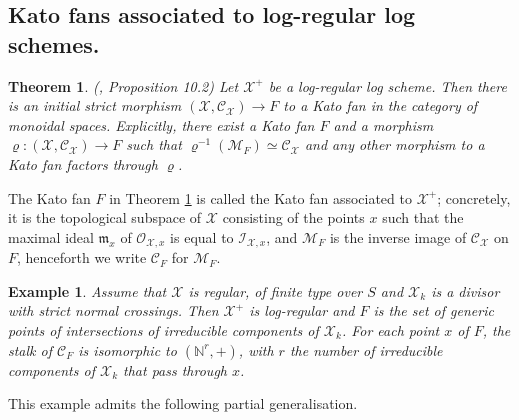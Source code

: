\documentclass{amsart}%
\numberwithin{equation}{subsection}
\theoremstyle{plain2}
\newtheorem{thm}[equation]{Theorem}
\theoremstyle{definition2}
\newtheorem{example}[equation]{Example}
\theoremstyle{stepstyle}
\theoremstyle{point}
\theoremstyle{subpoint}
\newcommand{\N}{\ensuremath{\mathbb{N}}}
\newcommand{\cX}{\ensuremath{\mathscr{X}}}
\newcommand{\caM}{\ensuremath{\mathcal{M}}}
\newcommand{\caC}{\ensuremath{\mathcal{C}}}
\begin{document}
\subsection{Kato fans associated to log-regular log schemes.}
\begin{thm}\label{kato fan associated} (\cite{Kato1994a}, Proposition 10.2)
Let $\cX^+$ be a log-regular log scheme. Then there is an initial strict morphism $(\cX, \caC_{\cX}) \rightarrow F$ to a Kato fan in the category of monoidal spaces. Explicitly, there exist a Kato fan $F$ and a morphism $\varrho: (\cX, \caC_{\cX}) \rightarrow F$ such that $\varrho^{-1}(\caM_{F}) \simeq \caC_{\cX}$ and any other morphism to a Kato fan factors through $\varrho$.
\end{thm}
The Kato fan $F$ in Theorem \ref{kato fan associated} is called the Kato fan associated to $\cX^+$; concretely, it is the topological subspace of
$\cX$ consisting of the points $x$ such that the maximal ideal $\mathfrak{m}_x$ of
$\mathcal{O}_{\cX,x}$ is equal to $\mathcal{I}_{\cX,x}$, and
$\mathcal{M}_F$ is the inverse image of $\mathcal{C}_{\cX}$ on
$F$, henceforth we write $\caC_F$ for $\caM_F$.

\begin{example} \label{example kato fan regular model}
Assume that $\cX$ is regular, of finite type over $S$ and $\cX_k$ is a divisor with strict
normal crossings. Then $\cX^+$ is log-regular and $F$ is the set
of generic points of intersections of irreducible components of
$\cX_k$. For each point $x$ of $F$, the stalk of $\mathcal{C}_F$
is isomorphic to $(\N^r,+)$, with $r$ the number of irreducible
components of $\cX_k$ that pass through $x$.
\end{example}

This example admits the following partial generalisation.
\end{document}

